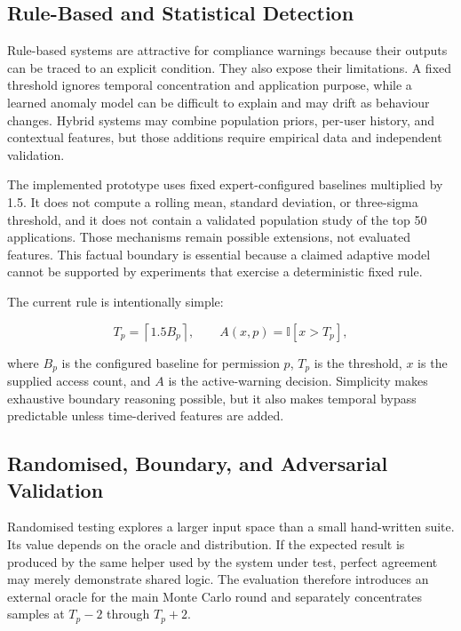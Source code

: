 \subsection{Rule-Based and Statistical Detection}

Rule-based systems are attractive for compliance warnings because their outputs can be traced to an explicit condition. They also expose their limitations. A fixed threshold ignores temporal concentration and application purpose, while a learned anomaly model can be difficult to explain and may drift as behaviour changes. Hybrid systems may combine population priors, per-user history, and contextual features, but those additions require empirical data and independent validation.

The implemented prototype uses fixed expert-configured baselines multiplied by 1.5. It does not compute a rolling mean, standard deviation, or three-sigma threshold, and it does not contain a validated population study of the top 50 applications. Those mechanisms remain possible extensions, not evaluated features. This factual boundary is essential because a claimed adaptive model cannot be supported by experiments that exercise a deterministic fixed rule.

The current rule is intentionally simple:

\begin{equation}
T_p=\left\lceil 1.5B_p \right\rceil,\qquad
A(x,p)=\mathbb{I}[x>T_p],
\end{equation}

where $B_p$ is the configured baseline for permission $p$, $T_p$ is the threshold, $x$ is the supplied access count, and $A$ is the active-warning decision. Simplicity makes exhaustive boundary reasoning possible, but it also makes temporal bypass predictable unless time-derived features are added.

\subsection{Randomised, Boundary, and Adversarial Validation}

Randomised testing explores a larger input space than a small hand-written suite. Its value depends on the oracle and distribution. If the expected result is produced by the same helper used by the system under test, perfect agreement may merely demonstrate shared logic. The evaluation therefore introduces an external oracle for the main Monte Carlo round and separately concentrates samples at $T_p-2$ through $T_p+2$.

